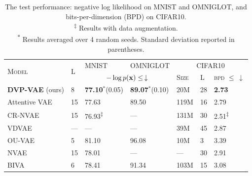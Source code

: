  \begin{table}[t]
        \centering
        \caption{The test performance: negative log likelihood on MNIST and OMNIGLOT, and bits-per-dimension (BPD) on CIFAR10.\\
        \textsuperscript{$\ddagger$} Results with data augmentation.\\
        \textsuperscript{$*$} Results averaged over 4 random seeds. Standard deviation reported in parentheses. 
        }
        \label{tab:main_results}
        \small{
        \begin{tabular}{l||lll|lll}
            \toprule
            \multirow{2}{*}{\textsc{Model}} & \multirow{2}{*}{\small{\textsc{L}}} & \footnotesize{\textsc{MNIST}} & \footnotesize{\textsc{OMNIGLOT}} & \multicolumn{3}{c}{\footnotesize{\textsc{CIFAR10}}}\\ 
                & &  \multicolumn{2}{c|}{$ - \log p({\mathbf{x}}) \leq \, \downarrow $} & \small{\textsc{Size}} & \small{\textsc{L}} & \small{\textsc{bpd $ \leq \, \downarrow $}}\\
            \midrule
            \textbf{DVP-VAE} \normalsize{(ours)} & 8 
                    & \textbf{77.10}$^*$\footnotesize{(0.05)} & \textbf{89.07}$^*$\footnotesize{(0.10)}  
                    & 20M & 28 & \textbf{2.73}\\
            Attentive VAE \small{\citep{apostolopoulou2021deep}}  & \multirow{1}{*}{15}
                    & \multirow{1}{*}{77.63} & \multirow{1}{*}{89.50} & 119M & 16 & 2.79\\
            CR-NVAE \small{\citep{sinha2021consistency}}               & \multirow{1}{*}{15}
                    & \multirow{1}{*}{76.93\textsuperscript{$\ddagger$}} & \multirow{1}{*}{---} & 131M & 30 & 2.51\textsuperscript{$\ddagger$} \\
            VDVAE \small{\citep{Child2020-ze}} & --- & --- & --- & 39M & 45& 2.87 \\
            OU-VAE \small{\citep{pervez21a}} & \multirow{1}{*}{5}
                    & \multirow{1}{*}{81.10} & \multirow{1}{*}{96.08}         
                    & 10M & 3 & 3.39 \\
            NVAE \small{\citep{vahdat2020nvae}}& \multirow{1}{*}{15}
                    & \multirow{1}{*}{78.01} & \multirow{1}{*}{---} 
                    & --- & 30 & 2.91 \\
            BIVA\small{\citep{maaloe2019biva}}   & 6
                    & 78.41 & 91.34 & 103M & 15 & 3.08 \\

\end{tabular}}
\end{table}
